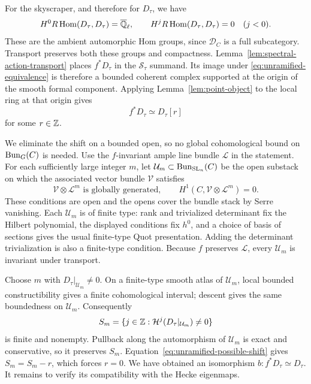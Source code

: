 For the skyscraper, and therefore for $D_\tau$, we have
\begin{equation}\label{eq:unramified-endomorphisms}
 H^0R\operatorname{Hom}(D_\tau,D_\tau)=\overline{\mathbb Q}_{\ell},\qquad
 H^jR\operatorname{Hom}(D_\tau,D_\tau)=0\quad(j<0).
\end{equation}
These are the ambient automorphic Hom groups, since $\mathcal D_C$ is a
full subcategory.  Transport preserves both these groups and compactness.
Lemma~\ref{lem:spectral-action-transport} places $f^*D_\tau$ in the
$\mathcal S_\tau$ summand.  Its image under
\eqref{eq:unramified-equivalence} is therefore a bounded coherent complex
supported at the origin of the smooth formal component.  Applying
Lemma~\ref{lem:point-object} to the local ring at that origin gives
\begin{equation}\label{eq:unramified-possible-shift}
                    f^*D_\tau\simeq D_\tau[r]
\end{equation}
for some $r\in\mathbb Z$.

We eliminate the shift on a bounded open, so no global cohomological
bound on $\operatorname{Bun}_G(C)$ is needed.  Use the $f$-invariant ample line bundle
$\mathcal L$ in the statement.
For each sufficiently large integer $m$, let
$\mathcal U_m\subset\operatorname{Bun}_{\mathrm{SL}_n}(C)$ be the open substack on which the
associated vector bundle $\mathcal V$ satisfies
\[
 \mathcal V\otimes\mathcal L^m\text{ is globally generated},
 \qquad H^1(C,\mathcal V\otimes\mathcal L^m)=0.
\]
These conditions are open and the opens cover the bundle stack by Serre
vanishing.  Each $\mathcal U_m$ is of finite type: rank and trivialized
determinant fix the Hilbert polynomial, the displayed conditions fix
$h^0$, and a choice of basis of sections gives the usual finite-type
Quot presentation.  Adding the determinant trivialization is also a
finite-type condition.  Because $f$ preserves $\mathcal L$, every
$\mathcal U_m$ is invariant under transport.

Choose $m$ with $D_\tau|_{\mathcal U_m}\ne0$.  On a finite-type smooth
atlas of $\mathcal U_m$, local bounded constructibility gives a finite
cohomological interval; descent gives the same boundedness on
$\mathcal U_m$.  Consequently
\[
 S_m=\{j\in\mathbb Z:\mathcal H^j(D_\tau|_{\mathcal U_m})\ne0\}
\]
is finite and nonempty.  Pullback along the automorphism of
$\mathcal U_m$ is exact and conservative, so it preserves $S_m$.
Equation~\eqref{eq:unramified-possible-shift} gives $S_m=S_m-r$, which
forces $r=0$.  We have obtained an isomorphism
$b:f^*D_\tau\simeq D_\tau$.  It remains to verify its compatibility with
the Hecke eigenmaps.

